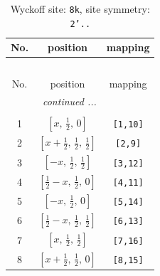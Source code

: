 \documentclass[fleqn,8pt]{jsarticle}
\begin{document}
\begin{longtable}{ccc}
\caption{Wyckoff site: {\tt 8k}, site symmetry: {\tt 2'..}}
 \\
 \hline \hline
No. & position & mapping \\ \hline \endfirsthead

\multicolumn{2}{l}{\tablename\ \thetable{}} \\
 \hline \hline
No. & position & mapping \\ \hline \endhead

 \hline \hline
\multicolumn{2}{r}{\footnotesize\it continued ...} \\ \endfoot

 \hline \hline
\multicolumn{2}{r}{} \\ \endlastfoot

1 & $\left[ x,\, \frac{1}{2},\, 0 \right]$ & {\tt [1,10]} \\ \hline
2 & $\left[ x + \frac{1}{2},\, \frac{1}{2},\, \frac{1}{2} \right]$ & {\tt [2,9]} \\ \hline
3 & $\left[ - x,\, \frac{1}{2},\, \frac{1}{2} \right]$ & {\tt [3,12]} \\ \hline
4 & $\left[ \frac{1}{2} - x,\, \frac{1}{2},\, 0 \right]$ & {\tt [4,11]} \\ \hline
5 & $\left[ - x,\, \frac{1}{2},\, 0 \right]$ & {\tt [5,14]} \\ \hline
6 & $\left[ \frac{1}{2} - x,\, \frac{1}{2},\, \frac{1}{2} \right]$ & {\tt [6,13]} \\ \hline
7 & $\left[ x,\, \frac{1}{2},\, \frac{1}{2} \right]$ & {\tt [7,16]} \\ \hline
8 & $\left[ x + \frac{1}{2},\, \frac{1}{2},\, 0 \right]$ & {\tt [8,15]} \\
\end{longtable}
\renewcommand{\arraystretch}{1.2}
\end{document}
